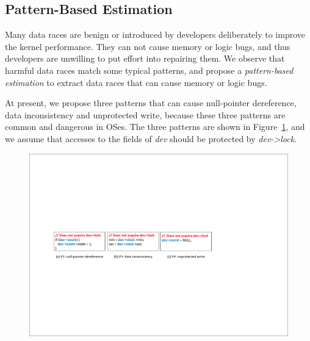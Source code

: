 \subsection{Pattern-Based Estimation}
\label{subsec_estimation}
Many data races are benign or introduced by developers deliberately to improve 
the kernel performance. They can not cause memory or logic bugs, and thus 
developers are unwilling to put effort into repairing them. We observe that 
harmful data races match some typical patterns, and propose a {\em 
pattern-based estimation} to extract data races that can cause memory or logic 
bugs.

At present, we propose three patterns that can cause null-pointer dereference, 
data inconsistency and unprotected write, because these three patterns are 
common and dangerous in OSes. The three patterns are shown in 
Figure~\ref{fig_pattern}, and we assume that accesses to the fields of {\em 
dev} should be protected by {\em dev->lock}.

\begin{figure}[htbp]
	\centering
	\includegraphics[width=1\linewidth]{figures/fig_pattern.pdf}
	\label{fig_pattern}
\end{figure}


